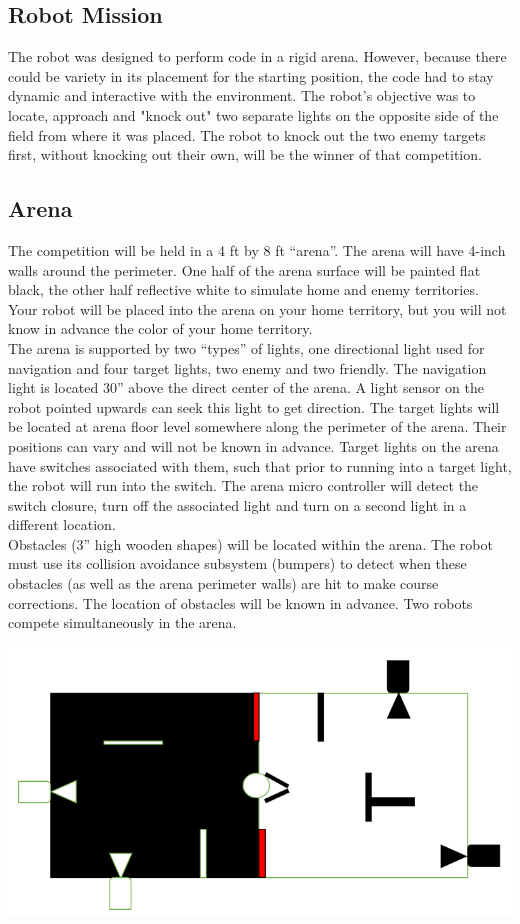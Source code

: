 \documentclass{article}
\begin{document}
\subsection{Robot Mission}
The robot was designed to perform code in a rigid arena. However, because there could be variety in its placement for the starting position, the code had to stay dynamic and interactive with the environment. The robot's objective was to locate, approach and "knock out" two separate lights on the opposite side of the field from where it was placed. The robot to knock out the two enemy targets first, without knocking out their own, will be the winner of that competition. 
\subsection{Arena}
The competition will be held in a 4 ft by 8 ft “arena”. The arena will have 4-inch walls around the perimeter.  One half of the arena surface will be painted flat black, the other half reflective white to simulate home and enemy territories.  Your robot will be placed into the arena on your home territory, but you will not know in advance the color of your home territory. \\

The arena is supported by two “types” of lights, one directional light used for navigation and four target lights, two enemy and two friendly.  The navigation light is located 30” above the direct center of the arena.  A light sensor on the robot pointed upwards can seek this light to get direction. The target lights will be located at arena floor level somewhere along the perimeter of the arena. Their positions can vary and will not be known in advance. Target lights on the arena have switches associated with them, such that prior to running into a target light, the robot will run into the switch.  The arena micro controller will detect the switch closure, turn off the associated light and turn on a second light in a different location. \\

Obstacles (3” high wooden shapes) will be located within the arena. The robot must use its collision avoidance subsystem (bumpers) to detect when these obstacles (as well as the arena perimeter walls) are hit to make course corrections. The location of obstacles will be known in advance. Two robots compete simultaneously in the arena. 

\includegraphics[width=\textwidth]{Arena.png}
\end{document}
